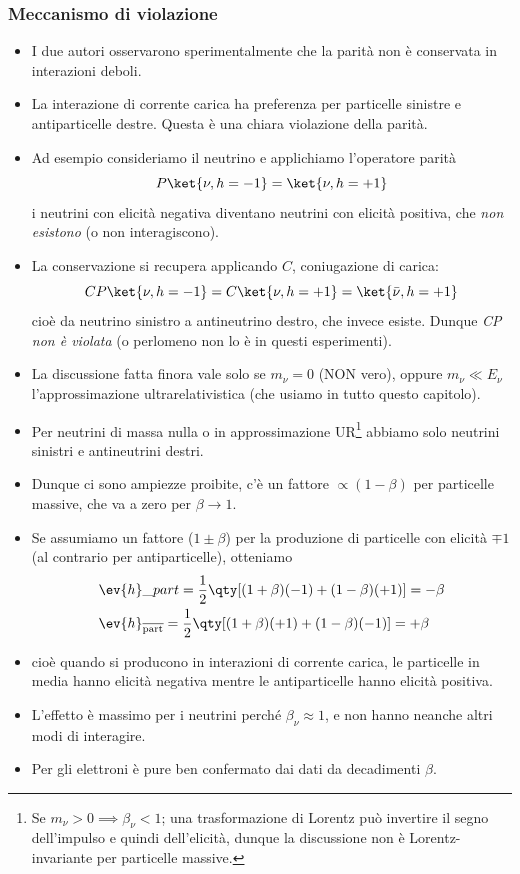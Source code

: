 \subsubsection{Meccanismo di violazione}
\begin{itemize}
    \item I due autori osservarono sperimentalmente che la parità non è conservata in interazioni deboli.
    \item La interazione di corrente carica ha preferenza per particelle sinistre e antiparticelle destre. Questa è una chiara violazione della parità.
    \item Ad esempio consideriamo il neutrino e applichiamo l'operatore parità
    \begin{equation*}
        P\ket{\nu,h=-1}=\ket{\nu,h=+1}
    \end{equation*}
    i neutrini con elicità negativa diventano neutrini con elicità positiva, che \textit{non esistono} (o non interagiscono).
    \item La conservazione si recupera applicando $C$, coniugazione di carica:
    \begin{equation*}
    CP\ket{\nu,h=-1}=C\ket{\nu,h=+1}=\ket{\bar\nu,h=+1}
    \end{equation*}
    cioè da neutrino sinistro a antineutrino destro, che invece esiste. Dunque \textit{CP non è violata} (o perlomeno non lo è in questi esperimenti).
    \item La discussione fatta finora vale solo se $m_\nu=0$ (NON vero), oppure $m_\nu\ll E_\nu$ l'approssimazione ultrarelativistica (che usiamo in tutto questo capitolo).
    \item Per neutrini di massa nulla o in approssimazione UR\footnote{Se $m_\nu>0\implies\beta_\nu<1$; una trasformazione di Lorentz può invertire il segno dell'impulso e quindi dell'elicità, dunque la discussione non è Lorentz-invariante per particelle massive.} abbiamo solo neutrini sinistri e antineutrini destri.
    \item Dunque ci sono ampiezze proibite, c'è un fattore $\propto(1-\beta)$ per particelle massive, che va a zero per $\beta\to1$.
    \item Se assumiamo un fattore ($1\pm\beta$) per la produzione di particelle con elicità $\mp1$ (al contrario per antiparticelle), otteniamo
    \begin{align*}
    &\ev{h}\_{part}=\frac{1}{2}\qty[(1+\beta)(-1)+(1-\beta)(+1)]=-\beta \\
    &\ev{h}_{\overline{\textnormal{part}}}=\frac{1}{2}\qty[(1+\beta)(+1)+(1-\beta)(-1)]=+\beta
    \end{align*}
    \item cioè quando si producono in interazioni di corrente carica, le particelle in media hanno elicità negativa mentre le antiparticelle hanno elicità positiva.
    \item L'effetto è massimo per i neutrini perché $\beta_\nu\approx1$, e non hanno neanche altri modi di interagire.
    \item Per gli elettroni è pure ben confermato dai dati da decadimenti $\beta$.
\end{itemize}
